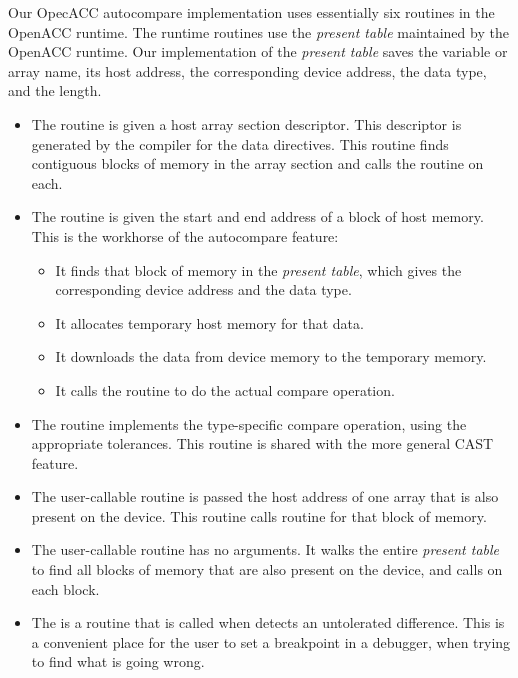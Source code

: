 Our OpecACC autocompare implementation uses essentially six routines in the OpenACC runtime.
The runtime routines use the \emph{present table}\cite{wolfe.ashes.17} maintained by the OpenACC runtime.
Our implementation of the \emph{present table} saves the variable or array name, its host address, the corresponding device address, the data type, and the length.
\begin{itemize}
\item The  routine is given a host array section descriptor.
This descriptor is generated by the compiler for the data directives.
This routine finds contiguous blocks of memory in the array section and calls the  routine on each.
\item The  routine is given the start and end address of a block of host memory.
This is the workhorse of the autocompare feature:
\begin{itemize}
\item It finds that block of memory in the \emph{present table}, which gives the corresponding device address and the data type.
\item It allocates temporary host memory for that data.
\item It downloads the data from device memory to the temporary memory.
\item It calls the  routine to do the actual compare operation.
\end{itemize}
\item The  routine implements the type-specific compare operation, using the appropriate tolerances.
This routine is shared with the more general CAST feature.
\item The user-callable  routine is passed the host address of one array that is also present on the device.
This routine calls  routine for that block of memory.
\item The user-callable  routine has no arguments.
It walks the entire \emph{present table} to find all blocks of memory that are also present on the device, and calls  on each block.
\item The  is a routine that is called when  detects an untolerated difference.
This is a convenient place for the user to set a breakpoint in a debugger, when trying to find what is going wrong.
\end{itemize}


